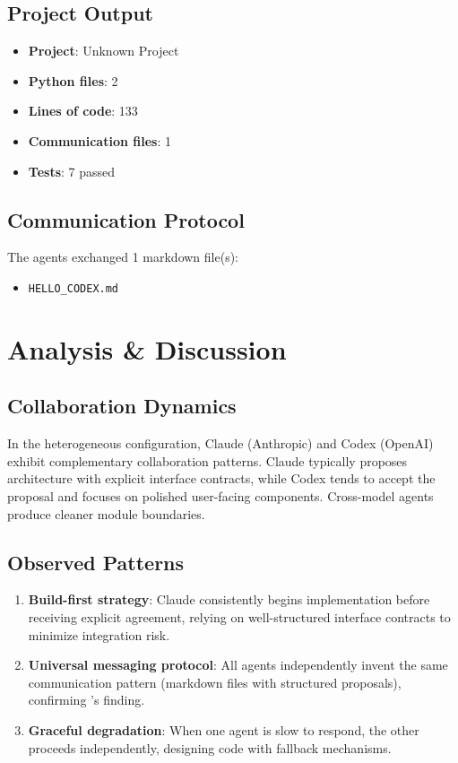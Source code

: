 \documentclass[11pt,a4paper]{article}
\begin{document}
\subsection{Project Output}

\begin{itemize}
  \item \textbf{Project}: Unknown Project
  \item \textbf{Python files}: 2
  \item \textbf{Lines of code}: 133
  \item \textbf{Communication files}: 1
  \item \textbf{Tests}: 7 passed
\end{itemize}

\subsection{Communication Protocol}

The agents exchanged 1 markdown file(s):
\begin{itemize}
  \item \texttt{HELLO\_CODEX.md}
\end{itemize}

\section{Analysis \& Discussion}

\subsection{Collaboration Dynamics}

In the heterogeneous configuration, Claude (Anthropic) and Codex (OpenAI) exhibit complementary collaboration patterns. Claude typically proposes architecture with explicit interface contracts, while Codex tends to accept the proposal and focuses on polished user-facing components. Cross-model agents produce cleaner module boundaries.

\subsection{Observed Patterns}

\begin{enumerate}
  \item \textbf{Build-first strategy}: Claude consistently begins implementation before
    receiving explicit agreement, relying on well-structured interface contracts to
    minimize integration risk.
  \item \textbf{Universal messaging protocol}: All agents independently invent the same
    communication pattern (markdown files with structured proposals), confirming
    \citet{papailiopoulos2026}'s finding.
  \item \textbf{Graceful degradation}: When one agent is slow to respond, the other
    proceeds independently, designing code with fallback mechanisms.
\end{enumerate}
\end{document}
